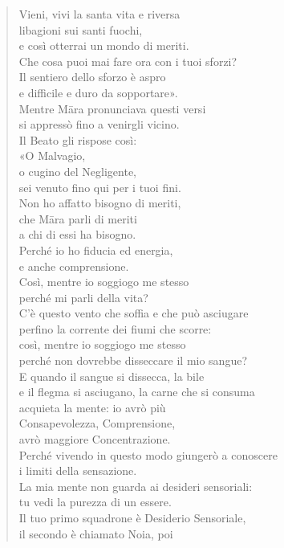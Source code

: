 \begin{quotation}
Vieni, vivi la santa vita e riversa \\
libagioni sui santi fuochi, \\
e così otterrai un mondo di meriti. \\
Che cosa puoi mai fare ora con i tuoi sforzi? \\
Il sentiero dello sforzo è aspro \\
e difficile e duro da sopportare». \\
Mentre Māra pronunciava questi versi \\
si appressò fino a venirgli vicino. \\
Il Beato gli rispose così: \\
«O Malvagio, \\
o cugino del Negligente, \\
sei venuto fino qui per i tuoi fini. \\
Non ho affatto bisogno di meriti, \\
che Māra parli di meriti \\
a chi di essi ha bisogno. \\
Perché io ho fiducia ed energia, \\
e anche comprensione. \\
Così, mentre io soggiogo me stesso \\
perché mi parli della vita? \\
C’è questo vento che soffia e che può asciugare \\
perfino la corrente dei fiumi che scorre: \\
così, mentre io soggiogo me stesso \\
perché non dovrebbe disseccare il mio sangue? \\
E quando il sangue si dissecca, la bile \\
e il flegma si asciugano, la carne che si consuma \\
acquieta la mente: io avrò più \\
Consapevolezza, Comprensione, \\
avrò maggiore Concentrazione. \\
Perché vivendo in questo modo giungerò a conoscere \\
i limiti della sensazione. \\
La mia mente non guarda ai desideri sensoriali: \\
tu vedi la purezza di un essere. \\
Il tuo primo squadrone è Desiderio Sensoriale, \\
il secondo è chiamato Noia, poi \\

\end{quotation}
